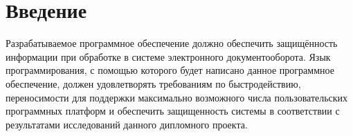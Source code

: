\section{Введение} \label{technologic_introduction}


Разрабатываемое программное обеспечение должно обеспечить защищённость информации при обработке в системе электронного документооборота. Язык программирования, с помощью которого будет написано данное программное обеспечение, должен удовлетворять требованиям по быстродействию, переносимости для поддержки максимально возможного числа пользовательских программных платформ и обеспечить защищенность системы в соответствии с результатами исследований данного дипломного проекта.